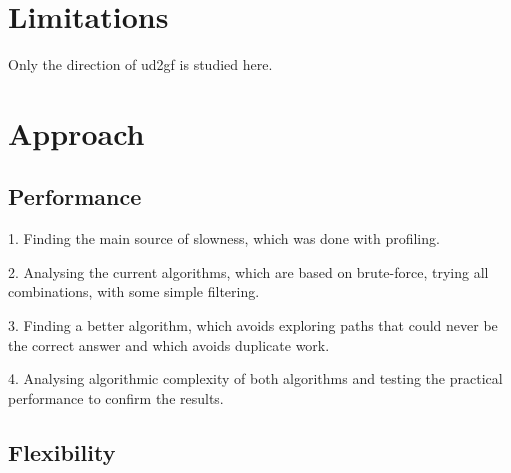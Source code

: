 \documentclass{article}
\begin{document}




\section{Limitations}

Only the direction of ud2gf is studied here. 



\section{Approach}

\subsection{Performance}

1. Finding the main source of slowness, which was done with profiling.

2. Analysing the current algorithms, which are based on brute-force, trying all combinations, with some simple filtering.

3. Finding a better algorithm, which avoids exploring paths that could never be the correct answer and which avoids duplicate work.

4. Analysing algorithmic complexity of both algorithms and testing the practical performance to confirm the results.

\subsection{Flexibility}
\end{document}
